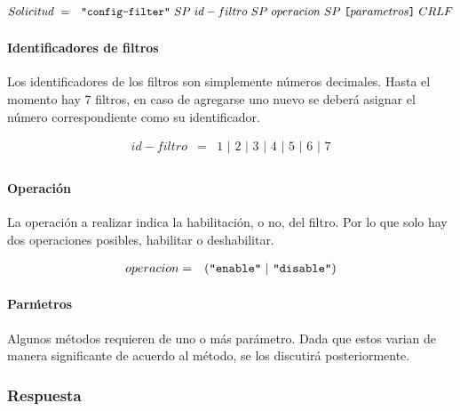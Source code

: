 \documentclass[a4paper,10pt]{article}
\begin{document}
        \begin{eqnarray*}
                Solicitud\ & = & \verb+"config-filter"+\,\,SP\,\,id-filtro\,\,SP\,\,operacion\,\,SP\,\,\verb+[+parametros\verb+]+\,\,CRLF\nonumber\\
        \end{eqnarray*}

            \paragraph*{Identificadores de filtros}
            Los identificadores de los filtros son simplemente n\'umeros decimales. Hasta el momento hay 7 filtros, en caso de agregarse uno nuevo se deber\'a 
            asignar el n\'umero correspondiente como su identificador.

            \begin{eqnarray*}
                id-filtro & = & 1\,\,|\,\,2\,\,|\,\,3\,\,|\,\,4\,\,|\,\,5\,\,|\,\,6\,\,|\,\,7\nonumber\\
            \end{eqnarray*}
            
            \paragraph*{Operaci\'on}
            La operaci\'on a realizar indica la habilitaci\'on, o no, del filtro. Por lo que solo hay dos operaciones posibles, habilitar o deshabilitar.

            \begin{eqnarray*}
                operacion & = & (\verb+"enable"+\,\,|\,\,\verb+"disable"+)\nonumber\\
            \end{eqnarray*}
            
            \paragraph*{Par\'metros}
            Algunos m\'etodos requieren de uno o m\'as par\'ametro. Dada que estos varian de manera significante de acuerdo al m\'etodo, se los discutir\'a 
            posteriormente.
        
        \subsubsection{Respuesta}
\end{document}
